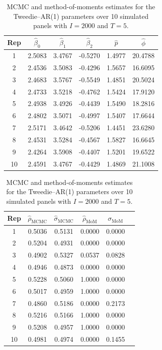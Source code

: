\documentclass{sfuthesis}
\numberwithin{equation}{chapter}
\begin{document}
\begin{table}[ht]
\centering
\caption{MCMC and method-of-moments estimates for the Tweedie--AR(1) parameters over 10 simulated panels with \(I = 2000\) and \(T = 5\).}
\begin{tabular}{cccccc}
\hline
Rep & \(\widehat{\beta}_0\) & \(\widehat{\beta}_1\) & \(\widehat{\beta}_2\) & \(\widehat{p}\) & \(\widehat{\phi}\)  \\
\hline
1  & 2.5083 & 3.4767 & -0.5270 & 1.4977 & 20.4788  \\
2  & 2.4536 & 3.5083 & -0.4296 & 1.5657 & 16.6095  \\
3  & 2.4683 & 3.5767 & -0.5549 & 1.4851 & 20.5024  \\
4  & 2.4733 & 3.5218 & -0.4762 & 1.5424 & 17.9120  \\
5  & 2.4938 & 3.4926 & -0.4439 & 1.5490 & 18.2816  \\
6  & 2.4802 & 3.5071 & -0.4997 & 1.5407 & 17.6644  \\
7  & 2.5171 & 3.4642 & -0.5206 & 1.4451 & 23.6280  \\
8  & 2.4531 & 3.5284 & -0.4567 & 1.5827 & 16.6645  \\
9  & 2.4264 & 3.5908 & -0.4407 & 1.5201 & 19.6522  \\
10 & 2.4591 & 3.4767 & -0.4429 & 1.4869 & 21.1008  \\
\hline
\end{tabular}

\medskip

\begin{tabular}{cccccc}
\hline
Rep & \(\widehat{\rho}_{\mathrm{MCMC}}\) & \(\widehat{\sigma}_{\mathrm{MCMC}}\) & \(\widehat{\rho}_{\mathrm{MoM}}\) & \(\widehat{\sigma}_{\mathrm{MoM}}\) \\
\hline
1  & 0.5036 & 0.5131 & 0.0000  & 0.0000   \\
2  & 0.5204 & 0.4931 & 0.0000  & 0.0000   \\
3  & 0.4902 & 0.5327 & 0.0537  & 0.0828   \\
4  & 0.4946 & 0.4873 & 0.0000  & 0.0000   \\
5  & 0.5228 & 0.5060 & 1.0000  & 0.0000   \\
6  & 0.5017 & 0.4959 & 1.0000  & 0.0000   \\
7  & 0.4860 & 0.5186 & 0.0000  & 0.2173   \\
8  & 0.5216 & 0.5166 & 1.0000  & 0.0000   \\
9  & 0.5208 & 0.4957 & 1.0000  & 0.0000   \\
10 & 0.4981 & 0.4974 & 0.0000  & 0.1455   \\
\hline
\end{tabular}
\label{tab:mcmc-mom-10rep}
\end{table}
\end{document}
